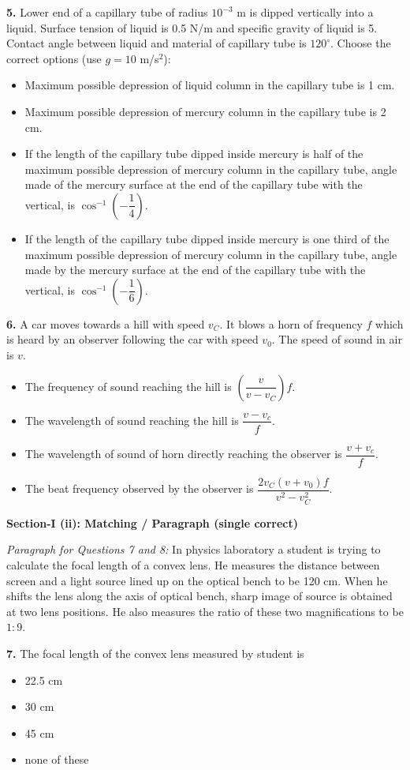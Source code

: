 \documentclass[10pt,twocolumn]{extarticle}
\newenvironment{qoptions}{\begin{itemize}[leftmargin=1.8em,itemsep=2pt,topsep=2pt,label={}]}{\end{itemize}}
\newcommand{\opt}[2]{\item[({#1})] {#2}}
\newcommand{\subsectionhdr}[1]{\par\vspace{3pt}\noindent\textbf{#1}\par\vspace{2pt}}
\begin{document}
\textbf{5.} Lower end of a capillary tube of radius $10^{-3}$ m is dipped vertically into a liquid. Surface tension of liquid is 0.5 N/m and specific gravity of liquid is 5. Contact angle between liquid and material of capillary tube is $120^{\circ}$. Choose the correct options (use $g = 10$ m/s$^2$):
\begin{qoptions}
\opt{A}{Maximum possible depression of liquid column in the capillary tube is 1 cm.}
\opt{B}{Maximum possible depression of mercury column in the capillary tube is 2 cm.}
\opt{C}{If the length of the capillary tube dipped inside mercury is half of the maximum possible depression of mercury column in the capillary tube, angle made of the mercury surface at the end of the capillary tube with the vertical, is $\cos^{-1}\left(-\dfrac14\right)$.}
\opt{D}{If the length of the capillary tube dipped inside mercury is one third of the maximum possible depression of mercury column in the capillary tube, angle made by the mercury surface at the end of the capillary tube with the vertical, is $\cos^{-1}\left(-\dfrac16\right)$.}
\end{qoptions}

\textbf{6.} A car moves towards a hill with speed $v_C$. It blows a horn of frequency $f$ which is heard by an observer following the car with speed $v_0$. The speed of sound in air is $v$.
\begin{qoptions}
\opt{A}{The frequency of sound reaching the hill is $\left(\dfrac{v}{v-v_C}\right)f$.}
\opt{B}{The wavelength of sound reaching the hill is $\dfrac{v-v_c}{f}$.}
\opt{C}{The wavelength of sound of horn directly reaching the observer is $\dfrac{v+v_c}{f}$.}
\opt{D}{The beat frequency observed by the observer is $\dfrac{2v_C(v+v_0)f}{v^2-v_C^2}$.}
\end{qoptions}

\subsectionhdr{Section-I (ii): Matching / Paragraph (single correct)}

\textit{Paragraph for Questions 7 and 8:} In physics laboratory a student is trying to calculate the focal length of a convex lens. He measures the distance between screen and a light source lined up on the optical bench to be 120 cm. When he shifts the lens along the axis of optical bench, sharp image of source is obtained at two lens positions. He also measures the ratio of these two magnifications to be $1:9$.

\textbf{7.} The focal length of the convex lens measured by student is
\begin{qoptions}
\opt{A}{22.5 cm}
\opt{B}{30 cm}
\opt{C}{45 cm}
\opt{D}{none of these}
\end{qoptions}
\end{document}
